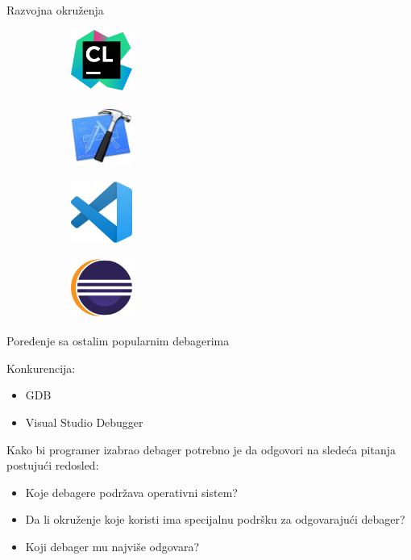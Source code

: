 \documentclass[bookmarks=true,bookmarksopen=true,pdfborder={0 0 0},pdfhighlight={/N},linkbordercolor={.5 .5 .5},implicit=false,unicode,xcolor={table}]{beamer}
\begin{document}
\begin{frame}{Razvojna okruženja}
\begin{figure}
	
	\begin{subfigure}{2cm}
		\includegraphics[width=2cm,height=2cm]{clion_logo}
	\end{subfigure}
	\begin{subfigure}{2cm}
		\includegraphics[width=2cm,height=2cm]{xcode_logo}
	\end{subfigure}
	\begin{subfigure}{2cm}
		\includegraphics[width=2cm,height=2cm]{visual_code}
	\end{subfigure}
	\begin{subfigure}{2cm}
		\includegraphics[width=2cm,height=2cm]{eclipse_logo}
	\end{subfigure}
\end{figure}
\end{frame}

\begin{frame}{}
\end{frame}

\begin{frame}{Poređenje sa ostalim popularnim debagerima}
	
	Konkurencija:
	\begin{itemize}
		\item GDB
		\item Visual Studio Debugger
	\end{itemize}

	Kako bi programer izabrao debager potrebno je da odgovori na sledeća pitanja postujući redosled:
	\begin{itemize}
		\item Koje debagere podržava operativni sistem?
		\item Da li okruženje koje koristi ima specijalnu podršku za odgovarajući debager?
		\item Koji debager mu najviše odgovara?
	\end{itemize}
	
\end{frame}
\end{document}
